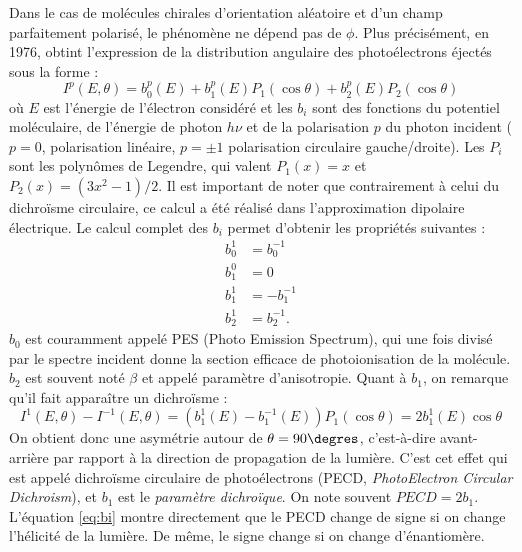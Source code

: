 Dans le cas de molécules chirales d'orientation aléatoire et d'un champ parfaitement polarisé, le phénomène ne dépend pas de $\phi$. Plus précisément, en 1976,  obtint l'expression de la distribution angulaire des photoélectrons éjectés sous la forme :
\begin{equation}
I^p(E,\theta) = b_0^p(E) + b_1^p(E) P_1(\cos\theta) + b_2^p(E) P_2(\cos\theta)
\label{eq:angulardistrib}
\end{equation}
où $E$ est l'énergie de l'électron considéré et les $b_i$ sont des fonctions du potentiel moléculaire, de l'énergie de photon $h\nu$ et de la polarisation $p$ du photon incident ($p = 0$, polarisation linéaire, $p =\pm1$ polarisation circulaire gauche/droite). Les $P_i$ sont les polynômes de Legendre, qui valent $P_1(x) = x$ et $P_2(x) = (3x^2-1)/2$. Il est important de noter que contrairement à celui du dichroïsme circulaire, ce calcul a été réalisé dans l'approximation dipolaire électrique. Le calcul complet des $b_i$ permet d'obtenir les propriétés suivantes  :
\begin{align}
b_0^1 &= b_0^{-1} \nonumber\\
b_1^0 &= 0\nonumber\\
b_1^1 &= -b_1^{-1}\nonumber\\
b_2^1 &= b_2^{-1}.
\label{eq:bi}
\end{align}
$b_0$ est couramment appelé PES (Photo Emission Spectrum), qui une fois divisé par le spectre incident donne la section efficace de photoionisation de la molécule. $b_2$ est souvent noté $\beta$ et appelé paramètre d'anisotropie. Quant à $b_1$, on remarque qu'il fait apparaître un dichroïsme :
\begin{equation}
I^{1}(E,\theta)-I^{-1}(E,\theta) = (b_1^1(E)-b_1^{-1}(E))P_1(\cos\theta) = 2b_1^1(E)\cos\theta
\label{eq:pecddef}
\end{equation}
On obtient donc une asymétrie autour de $\theta = 90\degres$, c'est-à-dire avant-arrière par rapport à la direction de propagation de la lumière. C'est cet effet qui est appelé dichroïsme circulaire de photoélectrons (PECD, \textit{PhotoElectron Circular Dichroism}), et $b_1$ est le \textit{paramètre dichroïque}. On note souvent $PECD = 2b_1$. L'équation \ref{eq:bi} montre directement que le PECD change de signe si on change l'hélicité de la lumière. De même, le signe change si on change d'énantiomère.

